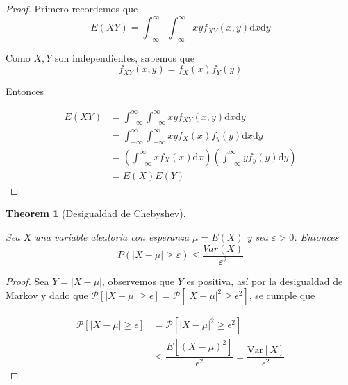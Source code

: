 \documentclass[
  letterpaper,
  DIV=11,
  numbers=noendperiod]{scrreprt}
\theoremstyle{definition}
\theoremstyle{plain}
\newtheorem{theorem}{Theorem}[chapter]
\theoremstyle{remark}
\begin{document}
\begin{proof}

Primero recordemos que \[
E\left(XY\right)=\int_{-\infty}^{\infty}\int_{-\infty}^{\infty}xyf_{XY}\left(x,y\right)\mathrm{d}x\mathrm{d}y
\]

Como \(X,Y\) son independientes, sabemos que \[
f_{XY}\left(x,y\right)=f_{X}\left(x\right)f_{Y}\left(y\right)
\]

Entonces

\begin{align*}
E\left(XY\right) & =\int_{-\infty}^{\infty}\int_{-\infty}^{\infty}xyf_{XY}\left(x,y\right)\mathrm{d}x\mathrm{d}y\\
& =\int_{-\infty}^{\infty}\int_{-\infty}^{\infty}xyf_{X}\left(x\right)f_{y}\left(y\right)\mathrm{d}x\mathrm{d}y\\
& =\left(\int_{-\infty}^{\infty}xf_{X}\left(x\right)\mathrm{d}x\right)\left(\int_{-\infty}^{\infty}yf_{y}\left(y\right)\mathrm{d}y\right)\\
& =E\left(X\right)E\left(Y\right)
\end{align*}

\end{proof}

\begin{theorem}[Desigualdad de
Chebyshev]\protect\hypertarget{thm-5.1}{}\label{thm-5.1}

Sea \(X\) una variable aleatoria con esperanza \(\mu=E(X)\) y sea
\(\varepsilon>0\). Entonces \[
P(|X-\mu|\geq\varepsilon)\leq\frac{Var(X)}{\varepsilon^{2}}
\]

\end{theorem}

\begin{proof}

Sea \(Y=\left|X-\mu\right|\), observemos que \(Y\) es positiva, así por
la desigualdad de Markov y dado que
\(\mathcal{P}\left[\left|X-\mu\right|\geq\epsilon\right] =\mathcal{P}\left[\left|X-\mu\right|^{2}\geq\epsilon^{2}\right]\),
se cumple que

\begin{align*}
\mathcal{P}\left[\left|X-\mu\right|\geq\epsilon\right] & =\mathcal{P}\left[\left|X-\mu\right|^{2}\geq\epsilon^{2}\right]\\
& \leq\dfrac{E\left[\left(X-\mu\right)^{2}\right]}{\epsilon^{2}}=\dfrac{\text{Var}\left[X\right]}{\epsilon^{2}}
\end{align*}

\end{proof}
\end{document}
